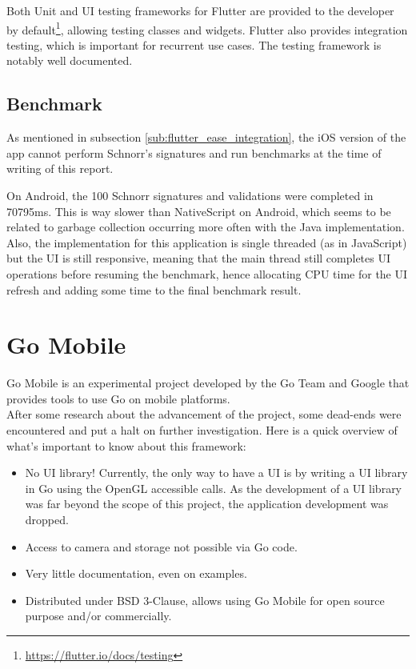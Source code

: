 \documentclass[11pt, a4paper, twoside, openright]{article} %
\begin{document}
{Both Unit and UI testing frameworks for Flutter are provided to the developer by default\footnote{\url{https://flutter.io/docs/testing}}, allowing testing classes and widgets. Flutter also provides integration testing, which is important for recurrent use cases. The testing framework is notably well documented.

\subsection{Benchmark}
As mentioned in subsection \ref{sub:flutter_ease_integration}, the iOS version of the app cannot perform Schnorr's signatures and run benchmarks at the time of writing of this report.

On Android, the 100 Schnorr signatures and validations were completed in 70795ms. This is way slower than NativeScript on Android, which seems to be related to garbage collection occurring more often with the Java implementation. Also, the implementation for this application is single threaded (as in JavaScript) but the UI is still responsive, meaning that the main thread still completes UI operations before resuming the benchmark, hence allocating CPU time for the UI refresh and adding some time to the final benchmark result.

\newpage
\section{Go Mobile}
Go Mobile is an experimental project developed by the Go Team and Google that provides tools to use Go on mobile platforms.\\
After some research about the advancement of the project, some dead-ends were encountered and put a halt on further investigation. Here is a quick overview of what's important to know about this framework:


\begin{itemize}
	\item No UI library! Currently, the only way to have a UI is by writing a UI library in Go using the OpenGL accessible calls. As the development of a UI library was far beyond the scope of this project, the application development was dropped.
	\item Access to camera and storage not possible via Go code.
	\item Very little documentation, even on examples.
	\item Distributed under BSD 3-Clause, allows using Go Mobile for open source purpose and/or commercially.
\end{itemize}



}
\end{document}
